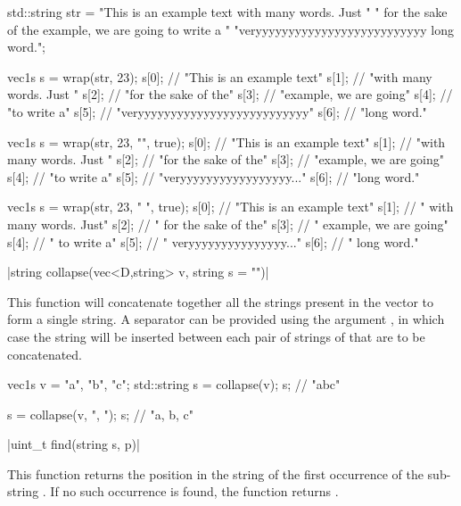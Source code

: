 \begin{example}
\begin{cppcode}
std::string str = "This is an example text with many words. Just "
    " for the sake of the example, we are going to write a "
    "veryyyyyyyyyyyyyyyyyyyyyyyyyy long word.";

vec1s s = wrap(str, 23);
s[0]; // "This is an example text"
s[1]; // "with many words. Just "
s[2]; // "for the sake of the"
s[3]; // "example, we are going"
s[4]; // "to write a"
s[5]; // "veryyyyyyyyyyyyyyyyyyyyyyyyyy"
s[6]; // "long word."

vec1s s = wrap(str, 23, "", true);
s[0]; // "This is an example text"
s[1]; // "with many words. Just "
s[2]; // "for the sake of the"
s[3]; // "example, we are going"
s[4]; // "to write a"
s[5]; // "veryyyyyyyyyyyyyyyyy..."
s[6]; // "long word."

vec1s s = wrap(str, 23, "  ", true);
s[0]; // "This is an example text"
s[1]; // "  with many words. Just"
s[2]; // "  for the sake of the"
s[3]; // "  example, we are going"
s[4]; // "  to write a"
s[5]; // "  veryyyyyyyyyyyyyyy..."
s[6]; // "  long word."
\end{cppcode}
\end{example}

\item \cppinline|string collapse(vec<D,string> v, string s = "")| 

This function will concatenate together all the strings present in the vector  to form a single string. A separator can be provided using the argument , in which case the string  will be inserted between each pair of strings of  that are to be concatenated.

\begin{example}
\begin{cppcode}
vec1s v = {"a", "b", "c"};
std::string s = collapse(v);
s; // "abc"

s = collapse(v, ", ");
s; // "a, b, c"
\end{cppcode}
\end{example}

\item \vectorfunc \cppinline|uint_t find(string s, p)| 

This function returns the position in the string  of the first occurrence of the sub-string . If no such occurrence is found, the function returns .


